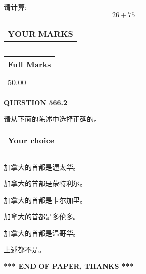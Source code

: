 \documentclass{ctexart}
\begin{document}
  
 
请计算:
\begin{equation}
26 +  %
75 = \nonumber
\end{equation}
 

 

 
  
\vspace{0.2in}
  
\noindent\begin{tabular}{|l|}
\hline
 YOUR MARKS  \\
\hline
 \\ 
 \\ 
\hline
\end{tabular}
\hspace{0.05in} \begin{tabular}{|l|}
\hline
 Full Marks  \\
\hline
 \\ 
50.00 \\
\hline
\end{tabular}
{\textbf{\Large{QUESTION
566.2 
}}}
  
  
请从下面的陈述中选择正确的。
  
  
\noindent\hspace{3.0in} \begin{tabular}{|l|}
\hline
Your choice \\
\hline
 \\ 
 \\ 
\hline
\end{tabular}
  
  
 
 
加拿大的首都是渥太华。
 
 
加拿大的首都是蒙特利尔。
 
 
加拿大的首都是卡尔加里。
 
 
加拿大的首都是多伦多。
 
 
加拿大的首都是温哥华。
 
 
 上述都不是。
 
 
   
   
 \vspace{0.2in}
 
   
   
   
   
\vspace{1.0in} 
{\textbf{\large{ *** END OF PAPER, THANKS *** }}} 
   
\end{document}
